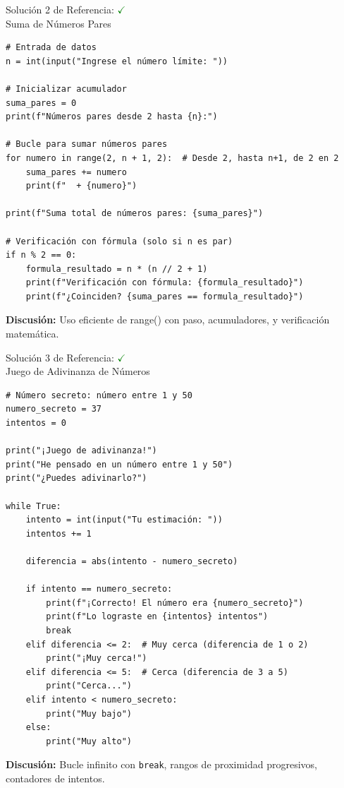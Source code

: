 \documentclass[10pt]{beamer}
\begin{document}
\begin{frame}[fragile]{Solución 2 de Referencia: \hfill \textcolor{green}{$\checkmark$} \\ Suma de Números Pares}
\begin{verbatim}
# Entrada de datos
n = int(input("Ingrese el número límite: "))

# Inicializar acumulador
suma_pares = 0
print(f"Números pares desde 2 hasta {n}:")

# Bucle para sumar números pares
for numero in range(2, n + 1, 2):  # Desde 2, hasta n+1, de 2 en 2
    suma_pares += numero
    print(f"  + {numero}")

print(f"Suma total de números pares: {suma_pares}")

# Verificación con fórmula (solo si n es par)
if n % 2 == 0:
    formula_resultado = n * (n // 2 + 1)
    print(f"Verificación con fórmula: {formula_resultado}")
    print(f"¿Coinciden? {suma_pares == formula_resultado}")
\end{verbatim}
\textbf{Discusión:} Uso eficiente de range() con paso, acumuladores, y verificación matemática.
\end{frame}


\begin{frame}[fragile]{Solución 3 de Referencia: \hfill \textcolor{green}{$\checkmark$} \\ Juego de Adivinanza de Números}
\begin{verbatim}
# Número secreto: número entre 1 y 50
numero_secreto = 37
intentos = 0

print("¡Juego de adivinanza!")
print("He pensado en un número entre 1 y 50")
print("¿Puedes adivinarlo?")

while True:
    intento = int(input("Tu estimación: "))
    intentos += 1
    
    diferencia = abs(intento - numero_secreto)
    
    if intento == numero_secreto:
        print(f"¡Correcto! El número era {numero_secreto}")
        print(f"Lo lograste en {intentos} intentos")
        break
    elif diferencia <= 2:  # Muy cerca (diferencia de 1 o 2)
        print("¡Muy cerca!")
    elif diferencia <= 5:  # Cerca (diferencia de 3 a 5)
        print("Cerca...")
    elif intento < numero_secreto:
        print("Muy bajo")
    else:
        print("Muy alto")
\end{verbatim}
\vspace{-0.4em}
{\scriptsize \textbf{Discusión:} Bucle infinito con \texttt{break}, rangos de proximidad progresivos, contadores de intentos.}
\end{frame}
\fi
\end{document}
